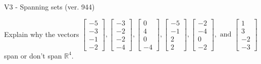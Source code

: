 \begin{exercise}
  \begin{exerciseTitle}V3 - Spanning sets (ver. 944)\end{exerciseTitle}
  \begin{exerciseStatement}
    Explain why the vectors \(\left[\begin{array}{r}
-5 \\
-3 \\
-1 \\
-2
\end{array}\right] , \left[\begin{array}{r}
-3 \\
-2 \\
-2 \\
-4
\end{array}\right] , \left[\begin{array}{r}
0 \\
4 \\
0 \\
-4
\end{array}\right] , \left[\begin{array}{r}
-5 \\
-1 \\
2 \\
2
\end{array}\right] , \left[\begin{array}{r}
-2 \\
-4 \\
0 \\
-2
\end{array}\right] , \text{ and } \left[\begin{array}{r}
1 \\
3 \\
-2 \\
-3
\end{array}\right]\) span or don't span \(\mathbb{R}^4\). 
	



\end{exerciseStatement}
\end{exercise}
